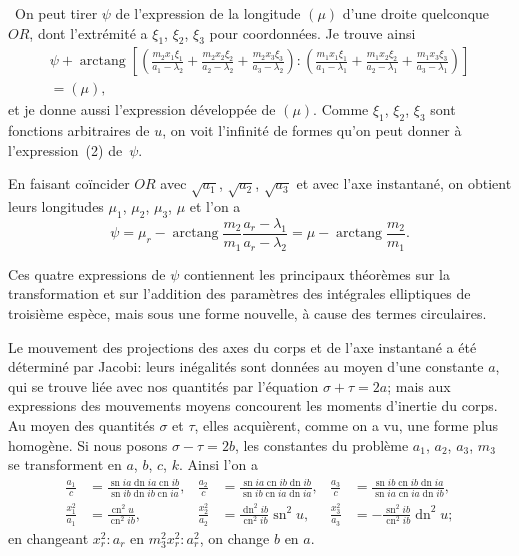 \documentclass[11pt,leqno,oneside,letterpaper]{book}[2005/09/16]
\DeclareMathOperator{\sn}{sn}
\DeclareMathOperator{\cn}{cn}
\DeclareMathOperator{\dn}{dn}
\DeclareMathOperator{\arctang}{arc tang}
\begin{document}
{\frqq}~On peut tirer $\psi$ de l'expression de la longitude $(\mu)$ d'une droite quelconque
$OR$, dont l'extr\'emit\'e a $\xi_1$, $\xi_2$, $\xi_3$ pour coordonn\'ees. Je trouve ainsi
\begin{multline*}
\psi + \arctang \left[
  \left( \tfrac{m_2 x_1 \xi_1}{a_1 - \lambda_2}
       + \tfrac{m_2 x_2 \xi_2}{a_2 - \lambda_2}
       + \tfrac{m_2 x_3 \xi_3}{a_3 - \lambda_2}
  \right) :
  \left( \tfrac{m_1 x_1 \xi_1}{a_1 - \lambda_1}
       + \tfrac{m_1 x_2 \xi_2}{a_2 - \lambda_1}
       + \tfrac{m_1 x_3 \xi_3}{a_3 - \lambda_1}
  \right)
\right] \\
= (\mu),\quad
\end{multline*}
et je donne aussi l'expression d\'evelopp\'ee de $(\mu)$. Comme $\xi_1$, $\xi_2$, $\xi_3$ sont
fonctions arbitraires de $u$, on voit l'infinit\'e de formes qu'on peut donner
\`a l'expression~(2) de~$\psi$.

En faisant co\"incider $OR$ avec $\sqrt{a_1}$, $\sqrt{a_2}$, $\sqrt{a_3}$ et avec l'axe instantan\'e,
on obtient leurs longitudes $\mu_1$, $\mu_2$, $\mu_3$, $\mu$ et l'on a
\[
\tag{4}
\psi =\mu_r-\arctang\frac{m_2}{m_1}\frac{a_r-\lambda_1}{a_r-\lambda_2}
=\mu-\arctang\frac{m_2}{m_1}.
\]

Ces quatre expressions de $\psi$ contiennent les principaux th\'eor\`emes
sur la transformation et sur l'addition des param\`etres des int\'egrales elliptiques
de troisi\`eme esp\`ece, mais sous une forme nouvelle, \`a cause des
termes circulaires.

Le mouvement des projections des axes du corps et de l'axe instantan\'e
a \'et\'e d\'etermin\'e par Jacobi: leurs in\'egalit\'es sont donn\'ees au moyen
d'une constante $a$, qui se trouve li\'ee avec nos quantit\'es par l'\'equation
$\sigma+\tau = 2a$; mais aux expressions des mouvements moyens concourent les
moments d'inertie du corps. Au moyen des quantit\'es $\sigma$ et $\tau$, elles acqui\`erent,
comme on a vu, une forme plus homog\`ene. Si nous posons $\sigma-\tau = 2b$,
les constantes du probl\`eme $a_1$, $a_2$, $a_3$, $m_3$ se transforment en $a$, $b$, $c$, $k$.
Ainsi l'on a
\begin{align*}
  \frac{a_1}{c}&=\frac{\sn ia \dn ia \cn ib}{\sn ib \dn ib \cn ia},
& \frac{a_2}{c}&=\frac{\sn ia \cn ib \dn ib}{\sn ib \cn ia \dn ia},
& \frac{a_3}{c}&=\frac{\sn ib \cn ib \dn ia}{\sn ia \cn ia \dn ib},
\\[0.7ex]
  \frac{x_1^2}{a_1}&= \frac{\cn^2  u}{\cn^2 ib},
& \frac{x_2^2}{a_2}&= \frac{\dn^2 ib}{\cn^2 ib}\sn^2 u,
& \frac{x_3^2}{a_3}&=-\frac{\sn^2 ib}{\cn^2 ib}\dn^2 u;
\end{align*}
en changeant $x_r^2:a_r$ en $m_3^2x_r^2:a_r^2$, on change $b$ en $a$.
\end{document}
